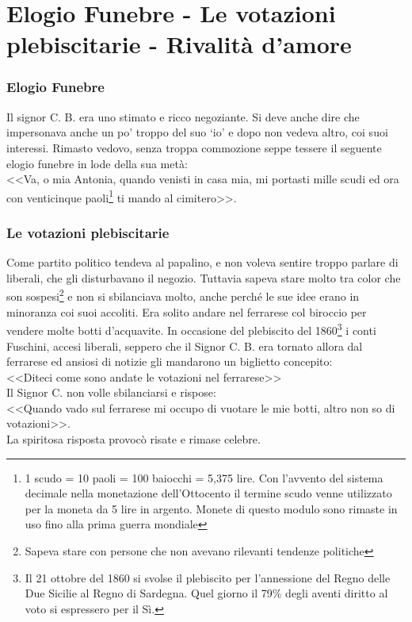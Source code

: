 
\chapter{Elogio Funebre - Le votazioni plebiscitarie - Rivalità d'amore}
\subsection{Elogio Funebre}
Il signor C. B. era uno stimato e ricco negoziante. Si deve anche dire che impersonava anche un po' troppo del suo `io' e dopo non vedeva altro, coi suoi interessi. Rimasto vedovo, senza troppa commozione seppe tessere il seguente elogio funebre in lode della sua metà:\\
\indent <<Va, o mia Antonia, quando venisti in casa mia, mi portasti mille scudi ed ora con venticinque paoli\footnote{1 scudo = 10 paoli = 100 baiocchi = 5,375 lire. Con l'avvento del sistema decimale nella monetazione dell'Ottocento il termine scudo venne utilizzato per la moneta da 5 lire in argento. Monete di questo modulo sono rimaste in uso fino alla prima guerra mondiale} ti mando al cimitero>>.\\

\subsection{Le votazioni plebiscitarie}
Come partito politico tendeva al papalino, e non voleva sentire troppo parlare di liberali, che gli disturbavano il negozio. Tuttavia sapeva stare molto tra color che son sospesi\footnote{Sapeva stare con persone che non avevano rilevanti tendenze politiche} e non si sbilanciava molto, anche perché le sue idee erano in minoranza coi suoi accoliti. Era solito andare nel ferrarese col biroccio per vendere molte botti d'acquavite. In occasione del plebiscito del 1860\footnote{Il 21 ottobre del 1860 si svolse il plebiscito per l'annessione del Regno delle Due Sicilie al Regno di Sardegna. Quel giorno il 79\% degli aventi diritto al voto si espressero per il Sì.} i conti Fuschini, accesi liberali, seppero che il Signor C. B. era tornato allora dal ferrarese ed ansiosi di notizie gli mandarono un biglietto concepito:\\
\indent <<Diteci come sono andate le votazioni nel ferrarese>>\\
\indent Il Signor C. non volle sbilanciarsi e rispose:\\
\indent<<Quando vado sul ferrarese mi occupo di vuotare le mie botti, altro non so di votazioni>>.\\
\indent La spiritosa risposta provocò risate e rimase celebre. \\
